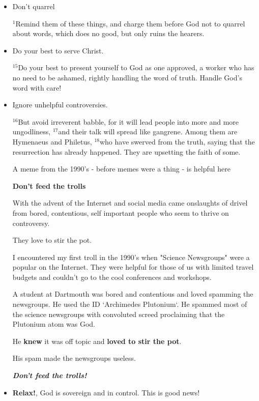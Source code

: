 \documentclass[12pt]{article} %
\newcommand{\superscript}[1]{\ensuremath{^{\textrm{#1}}}}
\begin{document}
\begin{itemize}
\item  Don't quarrel

\superscript{1}Remind them of these things, and
charge them before God not to quarrel about words, which does no good,
but only ruins the hearers.

\item Do your best to serve Christ.

\superscript{15}Do your best to present yourself to God as one approved,
a worker who has no need to be ashamed, rightly handling the word of truth.
Handle God's word with care!

\item Ignore unhelpful controversies.

\superscript{16}But avoid irreverent babble, for it will lead people into more
and more ungodliness, \superscript{17}and their talk will spread like gangrene.
Among them are Hymenaeus and Philetus, \superscript{18}who have swerved from the
truth, saying that the resurrection has already happened. They are upsetting the
faith of some.

A meme from the 1990's - before memes were a thing - is helpful here
  
\textbf{Don't feed the trolls}

With the advent of the Internet and social media came onslaughts of drivel
from bored, contentious, self important people who seem to thrive on
controversy.
  
They love to stir the pot.
  
I encountered my first troll in the 1990's when "Science Newsgroups" were
a popular on the Internet. They were helpful for those of us with limited
travel budgets and couldn't go to the cool conferences and workshops.
  
A student at Dartmouth was bored and contentious and loved spamming the
newsgroups. He used the ID `Archimedes Plutonium`. He spammed most of the
science newsgroups with convoluted screed proclaiming that the Plutonium
atom was God.
  
He \textbf{knew} it was off topic and \textbf{loved to stir the pot}.
  
His spam made the newsgroups useless.
  
\textbf{\emph{Don't feed the trolls!}}

\item{\textbf{Relax!}, God is sovereign and in control. This is good news!}


\end{itemize}
\end{document}
